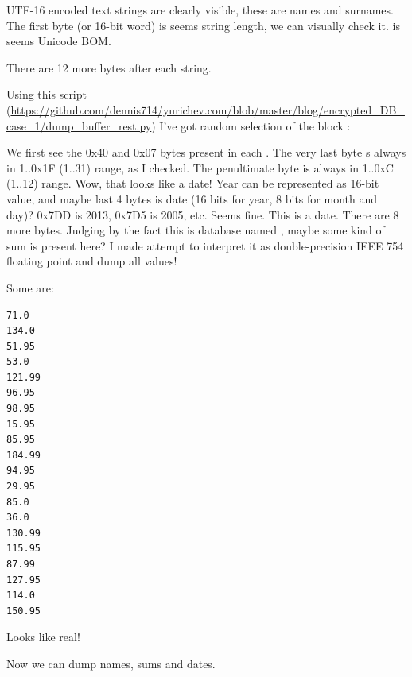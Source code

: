 UTF-16 encoded text strings are clearly visible, these are names and surnames.
The first byte (or 16-bit word) is seems string length, we can visually check it.
 is seems Unicode \ac{BOM}.

There are 12 more bytes after each string.

Using this script 
(\url{https://github.com/dennis714/yurichev.com/blob/master/blog/encrypted_DB_case_1/dump_buffer_rest.py})
I've got random selection of the block :



We first see the 0x40 and 0x07 bytes present in each .
The very last byte s always in 1..0x1F (1..31) range, as I checked.
The penultimate byte is always in 1..0xC (1..12) range.
Wow, that looks like a date!
Year can be represented as 16-bit value, and maybe last 4 bytes is date (16 bits for year, 8 bits
for month and day)?
0x7DD is 2013, 0x7D5 is 2005, etc. Seems fine. This is a date.
There are 8 more bytes.
Judging by the fact this is database named , maybe some kind of sum is present here?
I made attempt to interpret it as double-precision IEEE 754 floating point and dump all values!

Some are:

\begin{lstlisting}
71.0
134.0
51.95
53.0
121.99
96.95
98.95
15.95
85.95
184.99
94.95
29.95
85.0
36.0
130.99
115.95
87.99
127.95
114.0
150.95
\end{lstlisting}

Looks like real!

Now we can dump names, sums and dates.

